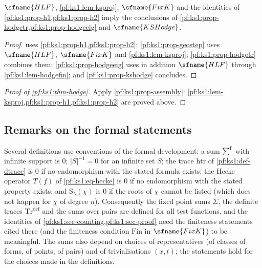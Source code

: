 \begin{proposition}[Assembly]\label{pf:ks1:prop-assembly}
$\sfname{HLF}$, \cref{pf:ks1:lem-ksproj}, $\sfname{FixK}$ and the identities of \cref{pf:ks1:prop-h1,pf:ks1:prop-h2} imply the conclusions of
\cref{pf:ks1:prop-hodgetr,pf:ks1:prop-hodgeeig} and $\sfname{KSHodge}$.
\end{proposition}

\begin{proof}
 uses \cref{pf:ks1:prop-h1,pf:ks1:prop-h2}; \cref{pf:ks1:prop-geostep} uses $\sfname{HLF}$, $\sfname{FixK}$ and
\cref{pf:ks1:lem-ksproj}; \cref{pf:ks1:prop-hodgetr} combines them; \cref{pf:ks1:prop-hodgeeig} uses in addition $\sfname{HLF}$ through
\cref{pf:ks1:lem-hodgefin}; and \cref{pf:ks1:prop-kshodge} concludes.
\end{proof}

\begin{proof}[Proof of \cref{pf:ks1:thm-hodge}]
Apply \cref{pf:ks1:prop-assembly}: \cref{pf:ks1:lem-ksproj,pf:ks1:prop-h1,pf:ks1:prop-h2} are proved above.
\end{proof}

\subsection{Remarks on the formal statements}\label{pf:ks1:sec-remarks}

\begin{remark}\label{pf:ks1:rem-conventions}
Several definitions use conventions of the formal development: a sum $\textstyle\sum\nolimits^{\mathrm f}$ with infinite support is $0$; $|S|^{-1}=0$ for an infinite set $S$; the trace
$\mathrm{htr}$ of \cref{pf:ks1:def-dtrace} is $0$ if no endomorphism with the stated formula exists; the Hecke operator $T(f)$ of \eqref{pf:ks1:eq-hecke} is $0$ if
no endomorphism with the stated property exists; and $\mathrm{S}_\lambda(\chi)$ is $0$ if the roots of $\chi$ cannot be listed (which does not happen for $\chi$ of degree
$n$). Consequently the fixed point sums $\Sigma$, the definite traces $\mathrm{Tr}^{\mathrm{def}}$ and the sums over pairs are defined for all test functions, and the
identities of \cref{pf:ks1:sec-counting,pf:ks1:sec-proof} need the finiteness statements cited there (and the finiteness condition $\mathrm{Fin}$ in
$\sfname{FixK}$) to be meaningful. The sums also depend on choices of representatives (of classes of forms, of points, of pairs) and of trivialisations
$(x,t)$; the statements hold for the choices made in the definitions.
\end{remark}

